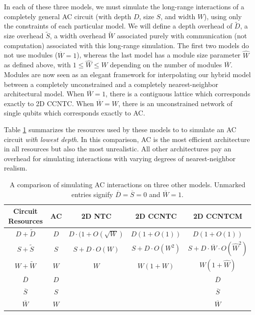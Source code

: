 In each of these three models, we must simulate the long-range
interactions of a completely general \textsf{AC} circuit (with
depth $D$, size $S$, and width $W$), using only the
constraints of each particular model. We will define a depth overhead
of $\tilde{D}$, a size overhead $\tilde{S}$, a width overhead $\tilde{W}$
associated purely with communication (not computation) associated with
this long-range simulation. The first two models do not use modules
($\overline{W} = 1$),
whereas the last model has a module size parameter $\hat{W}$ as defined above, with $1 \le \hat{W} \le W$ depending on the number of modules
$\overline{W}$. Modules are now seen as an elegant framework for
interpolating our hybrid model between a completely unconstrained and a completely nearest-neighbor architectural model. When $\overline{W} = 1$,
there is a contiguous lattice which corresponds exactly to \textsf{2D CCNTC}.
When $\overline{W} = W$, there is an unconstrained network of single qubits
which corresponds exactly to \textsf{AC}.

Table \ref{tab:mod-comp} summarizes the resources used by these models
to to simulate an \textsf{AC} circuit \emph{with lowest depth}.
In this comparison, \textsf{AC} is
the most efficient architecture in all resources
but also the most unrealistic. All other
architectures pay an overhead for simulating interactions with
varying degrees of nearest-neighbor realism.

\begin{table}
\begin{tabular}{|c|c|c|c|c|}
\hline
Circuit Resources & \textsf{AC} & \textsf{2D NTC} & \textsf{2D CCNTC} & \textsf{2D CCNTCM} \\
\hline
$D + \tilde{D}$ & $D$ & $D\cdot (1 + O(\sqrt{W})$    & $D(1 + O(1))$   & $D(1 + O(1))$ \\
$S + \tilde{S}$ & $S$ & $S + D\cdot O(W)$ & $S + D\cdot O(W^2)$ & $S + D\cdot \overline{W} \cdot O(\hat{W}^2)$ \\
$W + \tilde{W}$ & $W$ & $W$               & $W(1 + W)$    & $W(1 + \hat{W})$\\
\hline
$\overline{D}$  & $D$ &                   &               & $\overline{D}$\\
$\overline{S}$  & $S$ &                   &               & $\overline{S}$\\
$\overline{W}$  & $W$ &                   &               & $\overline{W}$\\
\hline
\end{tabular}
\caption{A comparison of simulating \textsf{AC} interactions on three
other models. Unmarked entries signify $\overline{D}=\overline{S} = 0$ and
$\overline{W} = 1$.}
\label{tab:mod-comp}
\end{table}

